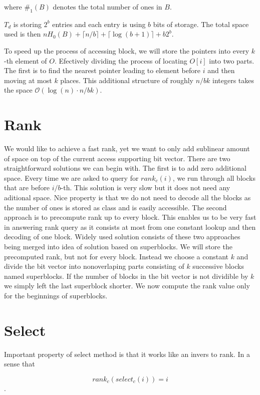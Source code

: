 where $\#_1(B)$ denotes the total number of ones in $B$. 

$T_d$ is storing $2^b$ entries and each entry is using $b$ bits of storage.
The total space used is then $nH_0(B) +  \lceil n/b \rceil + \lceil \log(b+1) \rceil + b2^b$.

To speed up the process of accessing block, we will store the pointers into every
$k$-th element of $O$. Efectively dividing the process of locating $O[i]$ into two
parts. The first is to find the nearest pointer leading to element before $i$ and
then moving at most $k$ places. This additional structure of roughly $n/bk$ integers
takes the space $\mathcal{O}(\log(n)\cdot n/bk)$.

\section{Rank}
\label{section:rank}

We would like to achieve a fast rank, yet we want to only add sublinear amount of
space on top of the current access supporting bit vector. There are two straightforward
solutions we can begin with. The first is to add zero additional space. Every
time we are asked to query for $rank_c(i)$, we run through all blocks that are
before $i/b$-th. This solution is very slow but it does not need any aditional space.
Nice property is that we do not need to decode all the blocks as the number of ones
is stored as class and is easily accessible.
The second approach is to precompute rank up to every block. This enables us to be very
fast in answering rank query as it consists at most from one constant lookup and then
decoding of one block. Widely used solution consists of these two approaches being merged
into idea of solution based on superblocks. We will store the precomputed rank, but not
for every block. Instead we choose a constant $k$ and divide the bit vector into nonoverlaping
parts consisting of $k$ successive blocks named superblocks. If the number of blocks in
the bit vector is not dividible by $k$ we simply left the last superblock shorter. We
now compute the rank value only for the beginnings of superblocks.

\section{Select}

Important property of select method is that it works like an invers to rank. In a sense that

                $$rank_c(select_c(i)) = i$$.


